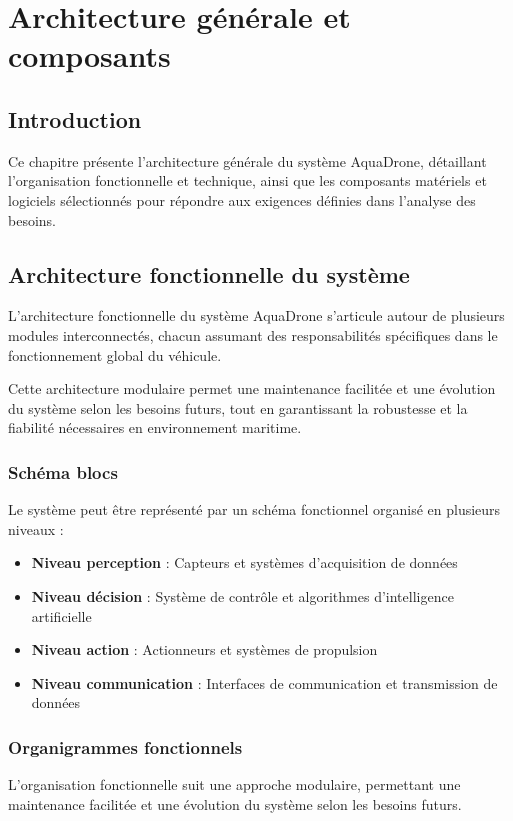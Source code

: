 \chapter[Architecture générale et composants]{Architecture générale et composants}
\label{cp:architecture-generale}

{
\parindent0pt

\section{Introduction}
Ce chapitre présente l'architecture générale du système AquaDrone, détaillant l'organisation fonctionnelle et technique, ainsi que les composants matériels et logiciels sélectionnés pour répondre aux exigences définies dans l'analyse des besoins.

\section{Architecture fonctionnelle du système}
L'architecture fonctionnelle du système AquaDrone s'articule autour de plusieurs modules interconnectés, chacun assumant des responsabilités spécifiques dans le fonctionnement global du véhicule.

\begin{block}[note]
Cette architecture modulaire permet une maintenance facilitée et une évolution du système selon les besoins futurs, tout en garantissant la robustesse et la fiabilité nécessaires en environnement maritime.
\end{block}

\subsection{Schéma blocs}
Le système peut être représenté par un schéma fonctionnel organisé en plusieurs niveaux :
\begin{itemize}
    \item \textbf{Niveau perception} : Capteurs et systèmes d'acquisition de données
    \item \textbf{Niveau décision} : Système de contrôle et algorithmes d'intelligence artificielle
    \item \textbf{Niveau action} : Actionneurs et systèmes de propulsion
    \item \textbf{Niveau communication} : Interfaces de communication et transmission de données
\end{itemize}

\subsection{Organigrammes fonctionnels}
L'organisation fonctionnelle suit une approche modulaire, permettant une maintenance facilitée et une évolution du système selon les besoins futurs.

}
